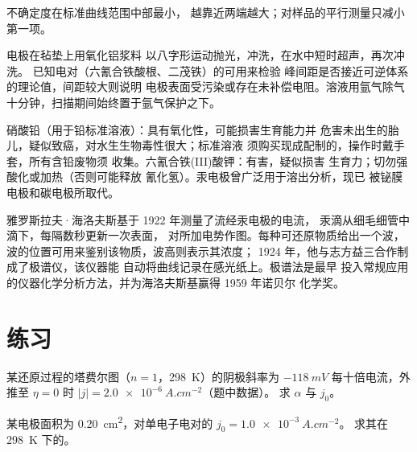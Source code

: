 不确定度在标准曲线范围中部最小，
越靠近两端越大；对样品的平行测量只减小第一项。

\begin{inthelab}[制备玻璃碳电极]
电极在毡垫上用氧化铝浆料
以八字形运动抛光，冲洗，在水中短时超声，再次冲洗。
已知电对（六氰合铁酸根、二茂铁）的可用来检验
峰间距是否接近可逆体系的理论值，间距较大则说明
电极表面受污染或存在未补偿电阻。溶液用氩气除气
十分钟，扫描期间始终置于氩气保护之下。
\end{inthelab}

\begin{safety}{}
硝酸铅（用于铅标准溶液）：具有氧化性，可能损害生育能力并
危害未出生的胎儿，疑似致癌，对水生生物毒性很大；标准溶液
须购买现成配制的，操作时戴手套，所有含铅废物须
收集。六氰合铁(III)酸钾：有害，疑似损害
生育力；切勿强酸化或加热（否则可能释放
氰化氢）。汞电极曾广泛用于溶出分析，现已
被铋膜电极和碳电极所取代。
\end{safety}

\begin{history}[海洛夫斯基的极谱仪，1922 年]
雅罗斯拉夫·海洛夫斯基于 1922 年测量了流经汞电极的电流，
汞滴从细毛细管中滴下，每隔数秒更新一次表面，
对所加电势作图。每种可还原物质给出一个波，
波的位置可用来鉴别该物质，波高则表示其浓度；
1924 年，他与志方益三合作制成了极谱仪，该仪器能
自动将曲线记录在感光纸上。极谱法是最早
投入常规应用的仪器化学分析方法，并为海洛夫斯基赢得 1959 年诺贝尔
化学奖。
\end{history}

\section{练习}

\begin{exercise}[$\star$]\label{exo:b3:electrode-kinetics:1}
某还原过程的塔费尔图（$n = 1$，\qty{298}{K}）的阴极斜率为 $-\qty{118}{mV}$
每十倍电流，外推至 $\eta = 0$ 时 $|j| = \qty{2.0e-6}{A.cm^{-2}}$（题中数据）。
求 $\alpha$ 与 $j_0$。
\end{exercise}

\begin{exercise}[$\star$]\label{exo:b3:electrode-kinetics:2}
某电极面积为 \qty{0.20}{cm^2}，对单电子电对的 $j_0 = \qty{1.0e-3}{A.cm^{-2}}$。
求其在 \qty{298}{K} 下的。
\end{exercise}

